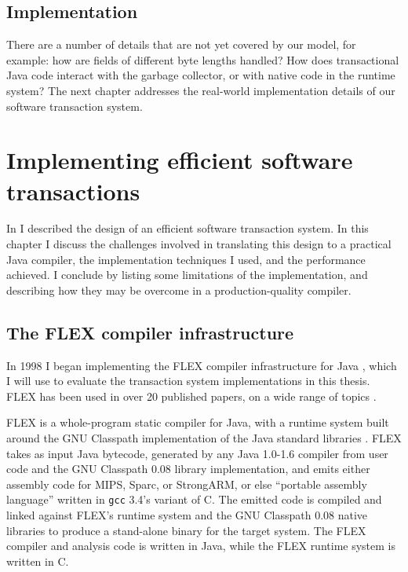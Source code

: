 \section*{Implementation}
There are a number of details that are not yet covered by our model,
for example: how are fields of different byte lengths handled?  How does
transactional Java code interact with the garbage collector, or with
native code in the runtime system?  The next chapter addresses the
real-world
implementation details of our software transaction system.

\chapter{Implementing efficient software transactions}\label{cha:stmimpl}

In  I described the design of an efficient
software transaction system.  In this chapter I discuss the
challenges involved in translating this design to a practical Java
compiler, the implementation techniques I used, and the performance
achieved.  I conclude by listing some limitations of the
implementation, and describing how they may be overcome in a
production-quality compiler.

\section{The FLEX compiler infrastructure}
In 1998 I began implementing the FLEX compiler infrastructure for
Java \cite{Flex}, which I will use to evaluate the transaction system
implementations in this thesis.  FLEX has been used in over 20
published papers, on a wide range of topics \cite{DallmeierLiWaZe06,AnanianAsKuLeLi06,Ananian05,AnanianAsKuLeLi05,SalcianuRi05,RinardSaBu04,AnanianRi03,BoyapatiSaBeRi03,FeizabadiBeRaLiRi03,GheorghioiuSaRi03,ZeeRi02,WitchelCaAs02,Gheorghioiu02,Francu02,WitchelLaAnAs01,Whaley01,Salcianu01,BeebeeRi01,Beebee01,Klock01,SalcianuRi01,VivienRi01,Ananian99,WhaleyRi99}.

FLEX is a whole-program static compiler for Java, with a runtime
system built around the GNU Classpath implementation of the Java
standard libraries \cite{Classpath}.  FLEX takes as input Java
bytecode, generated by any Java 1.0-1.6 compiler from user code and
the GNU Classpath 0.08 library implementation, and emits either
assembly code for MIPS, Sparc, or StrongARM, or else 
``portable assembly language'' written in \texttt{gcc} 3.4's variant
of C.  The emitted code is compiled and linked against FLEX's runtime
system and the GNU Classpath 0.08 native libraries to produce a
stand-alone binary for the target system.  The FLEX compiler and
analysis code is written in Java, while the FLEX runtime system is
written in C.

